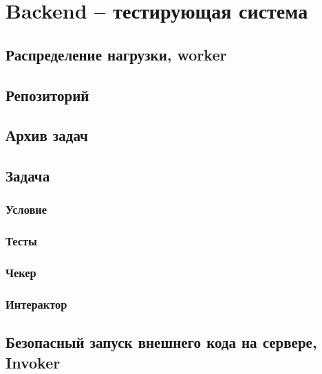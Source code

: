 \chapter{Backend -- тестирующая система}

\section{Распределение нагрузки, worker}

\section{Репозиторий}

\section{Архив задач}

\section{Задача}

\subsection{}

\subsection{Условие}

\subsection{Тесты}

\subsection{Чекер}

\subsection{Интерактор}

\section{Безопасный запуск внешнего кода на сервере, Invoker}

